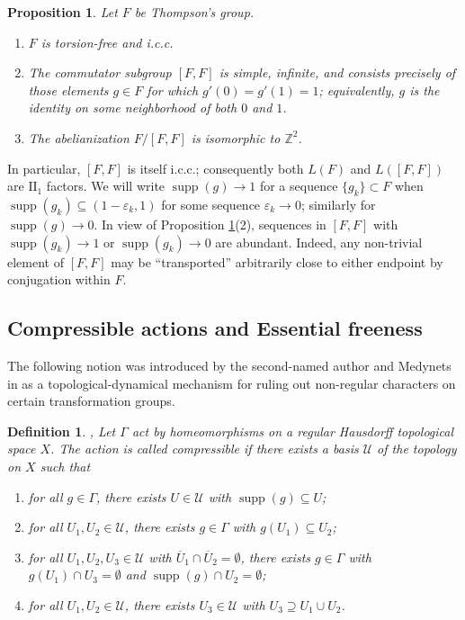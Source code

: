 \documentclass[11pt]{amsart}
\newtheorem{proposition}[theorem]{Proposition}
\newtheorem{definition}[theorem]{Definition}
\theoremstyle{definition}
\newcommand{\Z}{\mathbb{Z}}
\newcommand{\supp}{\operatorname{supp}}
\begin{document}
\begin{proposition}\label{prop:F-structure}
Let $F$ be Thompson's group.
\begin{enumerate}
\item $F$ is torsion-free and i.c.c.
\item The commutator subgroup $[F,F]$ is simple, infinite, and consists precisely of those elements $g \in F$ for which $g'(0) = g'(1) = 1$; equivalently, $g$ is the identity on some neighborhood of both $0$ and $1$.
\item The abelianization $F/[F,F]$ is isomorphic to $\Z^2$.
\end{enumerate}
\end{proposition}
In particular, $[F,F]$ is itself i.c.c.; consequently both $L(F)$ and $L([F,F])$ are $\mathrm{II}_1$ factors. We will write $\supp(g) \to 1$ for a sequence $\{g_k\} \subset F$ when $\supp(g_k) \subseteq (1 - \varepsilon_k, 1)$ for some sequence $\varepsilon_k \to 0$; similarly for $\supp(g) \to 0$. In view of Proposition \ref{prop:F-structure}(2), sequences in $[F,F]$ with $\supp(g_k) \to 1$ or $\supp(g_k) \to 0$ are abundant. Indeed, any non-trivial element of $[F,F]$ may be ``transported'' arbitrarily close to either endpoint by conjugation within $F$.

\subsection{Compressible actions and Essential freeness} The following notion was introduced by the second-named author and Medynets in \cite{DM14} as a topological-dynamical mechanism for ruling out non-regular characters on certain transformation groups.
\begin{definition}\cite[Definition 2.5]{DM14}, 
Let $\Gamma$ act by homeomorphisms on a regular Hausdorff topological space $X$. The action is called \emph{compressible} if there exists a basis $\mathcal{U}$ of the topology on $X$ such that
\begin{enumerate}
\item for all $g \in \Gamma$, there exists $U \in \mathcal{U}$ with $\supp(g) \subseteq U$;
\item for all $U_1, U_2 \in \mathcal{U}$, there exists $g \in \Gamma$ with $g(U_1) \subseteq U_2$;
\item for all $U_1, U_2, U_3 \in \mathcal{U}$ with $\overline{U}_1 \cap \overline{U}_2 = \emptyset$, there exists $g \in \Gamma$ with $g(U_1) \cap U_3 = \emptyset$ and $\supp(g) \cap U_2 = \emptyset$;
\item for all $U_1, U_2 \in \mathcal{U}$, there exists $U_3 \in \mathcal{U}$ with $U_3 \supseteq U_1 \cup U_2$.
\end{enumerate}
\end{definition}
\end{document}
